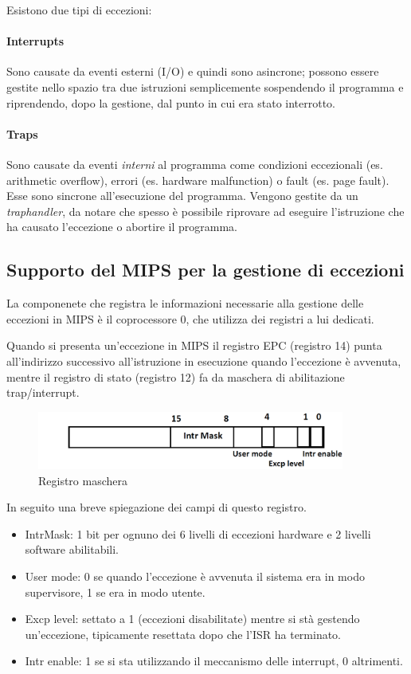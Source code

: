 \documentclass[class=book, crop=false, oneside]{standalone}
\begin{document}
Esistono due tipi di eccezioni:
\paragraph{Interrupts} Sono causate da eventi esterni (I/O) e quindi sono asincrone; possono essere gestite nello spazio tra due istruzioni semplicemente sospendendo il programma e riprendendo, dopo la gestione, dal punto in cui era stato interrotto.
\paragraph{Traps} Sono causate da eventi \emph{interni} al programma come condizioni eccezionali (es. arithmetic overflow), errori (es. hardware malfunction) o fault (es. page fault).
Esse sono sincrone all’esecuzione del programma.
Vengono gestite da un \emph{traphandler}, da notare che spesso è possibile riprovare ad eseguire l’istruzione che ha causato l’eccezione o abortire il programma.

\subsection{Supporto del MIPS per la gestione di eccezioni}
La componenete che registra le informazioni necessarie alla gestione delle eccezioni in MIPS è il coprocessore 0, che utilizza dei registri a lui dedicati.

Quando si presenta un'eccezione in MIPS il registro EPC (registro 14) punta all’indirizzo successivo all’istruzione in esecuzione quando l’eccezione è avvenuta, mentre il registro di stato (registro 12) fa da maschera di abilitazione trap/interrupt.

\begin{figure}[!h]
	\centering
	\includegraphics[width=0.9\textwidth,keepaspectratio]{registro-maschera}
	\caption{Registro maschera}
\end{figure}

In seguito una breve spiegazione dei campi di questo registro.
\begin{itemize}
	\item IntrMask:  1 bit per ognuno dei 6 livelli di eccezioni hardware e 2 livelli software abilitabili.
	\item User mode: 0 se quando l’eccezione è avvenuta il sistema era in modo supervisore, 1 se era in modo utente.
	\item Excp level: settato a 1 (eccezioni disabilitate) mentre si stà gestendo un’eccezione, tipicamente resettata dopo che l’ISR ha terminato.
	\item Intr enable: 1 se si sta utilizzando il meccanismo delle interrupt, 0 altrimenti.
\end{itemize}
\end{document}
